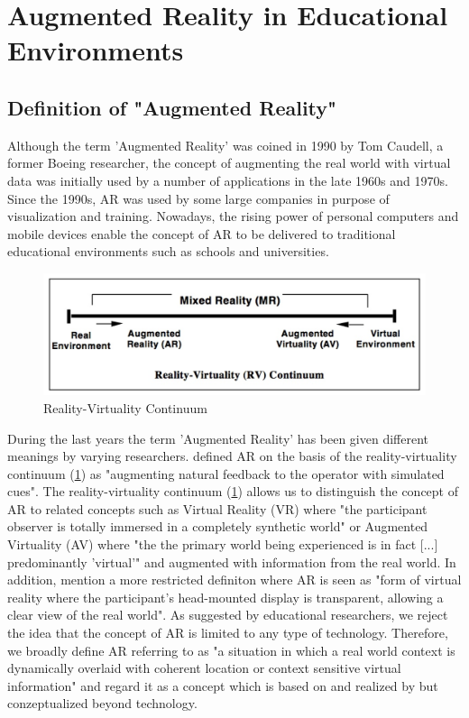 \section{Augmented Reality in Educational Environments}

\subsection{Definition of "Augmented Reality"}
Although the term 'Augmented Reality' was coined in 1990 by Tom Caudell, a former Boeing researcher, the concept of augmenting the real world with virtual data was initially used by a number of applications in the late 1960s and 1970s. Since the 1990s, AR was used by some large companies in purpose of visualization and training. Nowadays, the rising power of personal computers and mobile devices enable the concept of AR to be delivered to traditional educational environments such as schools and universities. \autocite [cf.][21]{Johnson.2010} 
\begin{figure}[ptbh]
    \centering
    \includegraphics[width=\linewidth]{figures/rvc.png}
    \caption[Reality-Virtuality Continuum]{Reality-Virtuality Continuum}
    \label{fig:RealityVirtualityContinuum}
\end{figure}

During the last years the term 'Augmented Reality' has been given different meanings by varying researchers. \autocite [cf.][42]{Wu.2013} \cite{Milgram.1994b} defined AR on the basis of the reality-virtuality continuum (\ref{fig:RealityVirtualityContinuum}) as "augmenting natural feedback to the operator with simulated cues". \autocite[283]{Milgram.1994b} The reality-virtuality continuum (\ref{fig:RealityVirtualityContinuum}) allows us to distinguish the concept of AR to related concepts such as Virtual Reality (VR) where "the participant observer is totally immersed in a completely synthetic world" \autocite[283]{Milgram.1994b} or Augmented Virtuality (AV) where "the the primary world being experienced is in fact [...] predominantly 'virtual'"\autocite[4]{Milgram.1994} and augmented with information from the real world. In addition, \cite{Milgram.1994b} mention a more restricted definiton where AR is seen as "form of virtual reality where the participant's head-mounted display is transparent, allowing a clear view of the real world". \autocite[283]{Milgram.1994b} As suggested by educational researchers,\autocite[cf.][42]{Wu.2013} we reject the idea that the concept of AR is limited to any type of technology. Therefore, we broadly define AR referring to \cite{Klopfer.2008} as "a situation in which a real world context is dynamically overlaid with coherent location or context sensitive virtual information"\autocite[205]{Klopfer.2008} and regard it as a concept which is based on and realized by but conzeptualized beyond technology.

